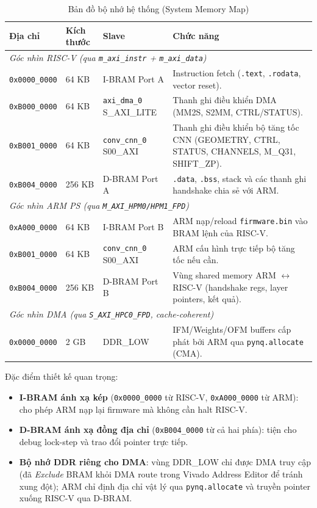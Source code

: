 \begin{table}[h]
\centering
\caption{Bản đồ bộ nhớ hệ thống (System Memory Map)}
\label{tab:memory_map}
\begin{tabular}{|l|l|l|p{5.5cm}|}
\hline
\textbf{Địa chỉ} & \textbf{Kích thước} & \textbf{Slave} & \textbf{Chức năng} \\ \hline
\multicolumn{4}{|l|}{\textit{Góc nhìn RISC-V (qua \texttt{m\_axi\_instr} + \texttt{m\_axi\_data})}} \\ \hline
\texttt{0x0000\_0000} & 64 KB & I-BRAM Port A & Instruction fetch (\texttt{.text}, \texttt{.rodata}, vector reset). \\ \hline
\texttt{0xB000\_0000} & 64 KB & \texttt{axi\_dma\_0} S\_AXI\_LITE & Thanh ghi điều khiển DMA (MM2S, S2MM, CTRL/STATUS). \\ \hline
\texttt{0xB001\_0000} & 64 KB & \texttt{conv\_cnn\_0} S00\_AXI & Thanh ghi điều khiển bộ tăng tốc CNN (GEOMETRY, CTRL, STATUS, CHANNELS, M\_Q31, SHIFT\_ZP). \\ \hline
\texttt{0xB004\_0000} & 256 KB & D-BRAM Port A & \texttt{.data}, \texttt{.bss}, stack và các thanh ghi handshake chia sẻ với ARM. \\ \hline
\multicolumn{4}{|l|}{\textit{Góc nhìn ARM PS (qua \texttt{M\_AXI\_HPM0/HPM1\_FPD})}} \\ \hline
\texttt{0xA000\_0000} & 64 KB & I-BRAM Port B & ARM nạp/reload \texttt{firmware.bin} vào BRAM lệnh của RISC-V. \\ \hline
\texttt{0xB001\_0000} & 64 KB & \texttt{conv\_cnn\_0} S00\_AXI & ARM cấu hình trực tiếp bộ tăng tốc nếu cần. \\ \hline
\texttt{0xB004\_0000} & 256 KB & D-BRAM Port B & Vùng shared memory ARM $\leftrightarrow$ RISC-V (handshake regs, layer pointers, kết quả). \\ \hline
\multicolumn{4}{|l|}{\textit{Góc nhìn DMA (qua \texttt{S\_AXI\_HPC0\_FPD}, cache-coherent)}} \\ \hline
\texttt{0x0000\_0000} & 2 GB & DDR\_LOW & IFM/Weights/OFM buffers cấp phát bởi ARM qua \texttt{pynq.allocate} (CMA). \\ \hline
\end{tabular}
\end{table}

Đặc điểm thiết kế quan trọng:
\begin{itemize}
    \item \textbf{I-BRAM ánh xạ kép} (\texttt{0x0000\_0000} từ RISC-V, \texttt{0xA000\_0000} từ ARM): cho phép ARM nạp lại firmware mà không cần halt RISC-V.
    \item \textbf{D-BRAM ánh xạ đồng địa chỉ} (\texttt{0xB004\_0000} từ cả hai phía): tiện cho debug lock-step và trao đổi pointer trực tiếp.
    \item \textbf{Bộ nhớ DDR riêng cho DMA}: vùng DDR\_LOW chỉ được DMA truy cập (đã \textit{Exclude} BRAM khỏi DMA route trong Vivado Address Editor để tránh xung đột); ARM chỉ định địa chỉ vật lý qua \texttt{pynq.allocate} và truyền pointer xuống RISC-V qua D-BRAM.
\end{itemize}

